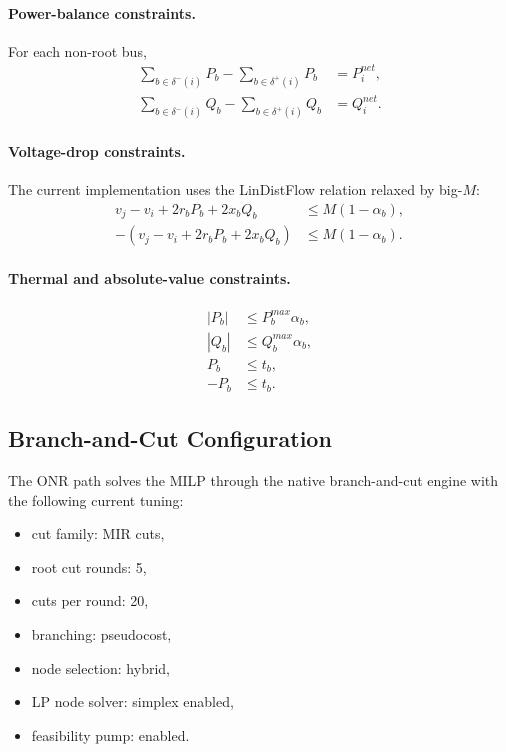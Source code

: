 \paragraph{Power-balance constraints.}
For each non-root bus,
\begin{align}
\sum_{b\in\delta^{-}(i)} P_b - \sum_{b\in\delta^{+}(i)} P_b &= P_i^{net}, \\
\sum_{b\in\delta^{-}(i)} Q_b - \sum_{b\in\delta^{+}(i)} Q_b &= Q_i^{net}.
\end{align}

\paragraph{Voltage-drop constraints.}
The current implementation uses the LinDistFlow relation relaxed by big-\(M\):
\begin{align}
v_j - v_i + 2r_b P_b + 2x_b Q_b &\le M(1-\alpha_b), \\
-(v_j - v_i + 2r_b P_b + 2x_b Q_b) &\le M(1-\alpha_b).
\end{align}

\paragraph{Thermal and absolute-value constraints.}
\begin{align}
|P_b| &\le P_b^{max}\alpha_b, \\
|Q_b| &\le Q_b^{max}\alpha_b, \\
P_b &\le t_b, \\
-P_b &\le t_b.
\end{align}

\subsection{Branch-and-Cut Configuration}

The ONR path solves the MILP through the native branch-and-cut engine with the
following current tuning:
\begin{itemize}
  \item cut family: MIR cuts,
  \item root cut rounds: 5,
  \item cuts per round: 20,
  \item branching: pseudocost,
  \item node selection: hybrid,
  \item LP node solver: simplex enabled,
  \item feasibility pump: enabled.
\end{itemize}

